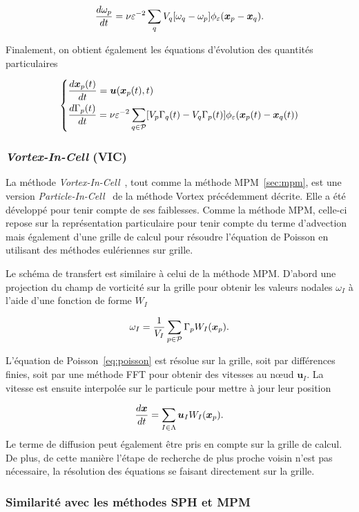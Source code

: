 \begin{equation*}
    \frac{d \omega_p}{dt} = \nu \varepsilon^{-2} \sum_q V_q [\omega_q - \omega_p] \phi_\varepsilon(\bm{x}_p - \bm{x}_q).
\end{equation*}

Finalement, on obtient également les équations d'évolution des quantités particulaires

\begin{gather*}
    \left\{\begin{aligned}
         & \frac{d \bm{x}_p(t)}{dt} = \bm u(\bm{x}_p(t), t)                                                                                                       \\
         & \frac{d\Gamma_p(t)}{dt} = \nu \varepsilon^{-2} \sum_{q \in \mathcal P} [V_p \Gamma_q(t) - V_q \Gamma_p(t)] \phi_\varepsilon(\bm{x}_p(t) - \bm{x}_q(t))
    \end{aligned}\right.
\end{gather*}

\subsubsection{\textit{Vortex-In-Cell} (VIC)}

La méthode \textit{Vortex-In-Cell}~\cite{christiansen_1973}, tout comme la méthode MPM~\ref{sec:mpm}, est une version \textit{Particle-In-Cell}~\cite{birdsall_1969} de la méthode Vortex précédemment décrite. Elle a été développé pour tenir compte de ses faiblesses. Comme la méthode MPM, celle-ci repose sur la représentation particulaire pour tenir compte du terme d'advection mais également d'une grille de calcul pour résoudre l'équation de Poisson en utilisant des méthodes eulériennes sur grille.

Le schéma de transfert est similaire à celui de la méthode MPM. D'abord une projection du champ de vorticité sur la grille pour obtenir les valeurs nodales $\omega_I$ à l'aide d'une fonction de forme $W_I$

\begin{equation*}
    \omega_I = \frac{1}{V_I}\sum_{p \in \mathcal P} \Gamma_p W_I(\bm{x}_p).
\end{equation*}

L'équation de Poisson~\ref{eq:poisson} est résolue sur la grille, soit par différences finies, soit par une méthode FFT pour obtenir des vitesses au nœud $\bm u_I$. La vitesse est ensuite interpolée sur le particule pour mettre à jour leur position

\begin{equation*}
    \frac{d \bm x}{d t} = \sum_{I \in \Lambda} \bm u_I W_I(\bm{x}_p).
\end{equation*}
Le terme de diffusion peut également être pris en compte sur la grille de calcul. De plus, de cette manière l'étape de recherche de plus proche voisin n'est pas nécessaire, la résolution des équations se faisant directement sur la grille.

\subsubsection{Similarité avec les méthodes SPH et MPM}

